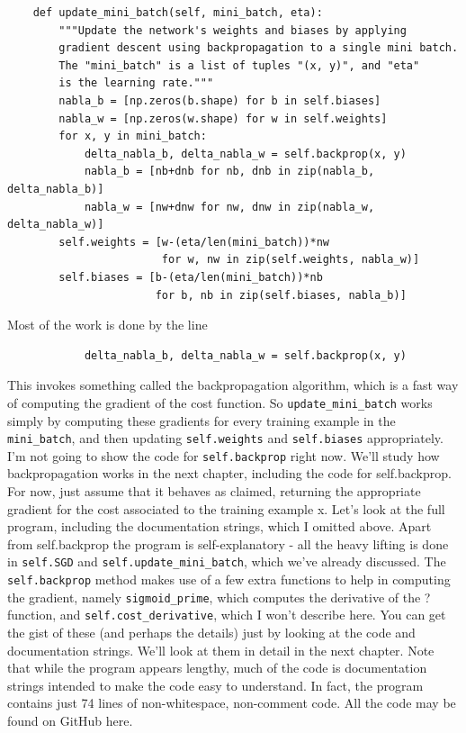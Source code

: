 \begin{lstlisting}
    def update_mini_batch(self, mini_batch, eta):
        """Update the network's weights and biases by applying
        gradient descent using backpropagation to a single mini batch.
        The "mini_batch" is a list of tuples "(x, y)", and "eta"
        is the learning rate."""
        nabla_b = [np.zeros(b.shape) for b in self.biases]
        nabla_w = [np.zeros(w.shape) for w in self.weights]
        for x, y in mini_batch:
            delta_nabla_b, delta_nabla_w = self.backprop(x, y)
            nabla_b = [nb+dnb for nb, dnb in zip(nabla_b, delta_nabla_b)]
            nabla_w = [nw+dnw for nw, dnw in zip(nabla_w, delta_nabla_w)]
        self.weights = [w-(eta/len(mini_batch))*nw 
                        for w, nw in zip(self.weights, nabla_w)]
        self.biases = [b-(eta/len(mini_batch))*nb 
                       for b, nb in zip(self.biases, nabla_b)]
\end{lstlisting}
                       
Most of the work is done by the line 

\begin{lstlisting}
            delta_nabla_b, delta_nabla_w = self.backprop(x, y)
\end{lstlisting}

This invokes something called the backpropagation algorithm, which is a fast way of computing the gradient of the cost function. So \lstinline{update_mini_batch} works simply by computing these gradients for every training example in the \lstinline{mini_batch}, and then updating \lstinline{self.weights} and \lstinline{self.biases} appropriately.
I'm not going to show the code for \lstinline{self.backprop} right now. We'll study how backpropagation works in the next chapter, including the code for self.backprop. For now, just assume that it behaves as claimed, returning the appropriate gradient for the cost associated to the training example x.
Let's look at the full program, including the documentation strings, which I omitted above. Apart from self.backprop the program is self-explanatory - all the heavy lifting is done in \lstinline{self.SGD} and \lstinline{self.update_mini_batch}, which we've already discussed. The \lstinline{self.backprop} method makes use of a few extra functions to help in computing the gradient, namely \lstinline{sigmoid_prime}, which computes the derivative of the ? function, and \lstinline{self.cost_derivative}, which I won't describe here. You can get the gist of these (and perhaps the details) just by looking at the code and documentation strings. We'll look at them in detail in the next chapter. Note that while the program appears lengthy, much of the code is documentation strings intended to make the code easy to understand. In fact, the program contains just 74 lines of non-whitespace, non-comment code. All the code may be found on GitHub here.

